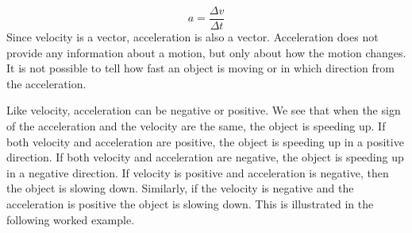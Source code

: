     \begin{equation}
    a=\frac{\Delta v}{\Delta t}\tag{20.18}
      \end{equation}
      \label{m38794*id67769}Since velocity is a vector, acceleration is also a vector. Acceleration does not provide any information about a motion, but only about how the motion changes. It is not possible to tell how fast an object is moving or in which direction from the acceleration.\par 
      \label{m38794*id67775}Like velocity, acceleration can be negative or positive. We see that when the sign of the acceleration and the velocity are the same, the object is speeding up. If both velocity and acceleration are positive, the object is speeding up in a positive direction. If both velocity and acceleration are negative, the object is speeding up in a negative direction.
If velocity is positive and acceleration is negative, then the object is slowing down. Similarly, if the velocity is negative and the acceleration is positive the object is slowing down. This is illustrated in the following worked example.\par 
\label{m38794*secfhsst!!!underscore!!!id1419}\vspace{.5cm} 
      \noindent
